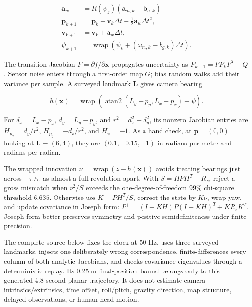 \[
\begin{aligned}
\mathbf{a}_w &= R(\psi_k)(\mathbf{a}_{m,k}-\mathbf{b}_{a,k}),\\
\mathbf{p}_{k+1} &= \mathbf{p}_k+\mathbf{v}_k\Delta t+\tfrac12\mathbf{a}_w\Delta t^2,\\
\mathbf{v}_{k+1} &= \mathbf{v}_k+\mathbf{a}_w\Delta t,\\
\psi_{k+1} &= \operatorname{wrap}(\psi_k+(\omega_{m,k}-b_{g,k})\Delta t).
\end{aligned}
\]

The transition Jacobian \(F=\partial f/\partial\mathbf{x}\) propagates uncertainty as \(P_{k+1}=FP_kF^T+Q\). Sensor noise enters through a first-order map \(G\); bias random walks add their variance per sample. A surveyed landmark \(\mathbf{L}\) gives camera bearing

\[
h(\mathbf{x})=\operatorname{wrap}\!\left(\operatorname{atan2}(L_y-p_y,L_x-p_x)-\psi\right).
\]

For \(d_x=L_x-p_x\), \(d_y=L_y-p_y\), and \(r^2=d_x^2+d_y^2\), its nonzero Jacobian entries are \(H_{p_x}=d_y/r^2\), \(H_{p_y}=-d_x/r^2\), and \(H_\psi=-1\). As a hand check, at \(\mathbf{p}=(0,0)\) looking at \(\mathbf{L}=(6,4)\), they are \((0.1,-0.15,-1)\) in radians per metre and radians per radian.

The wrapped innovation \(\nu=\operatorname{wrap}(z-h(\mathbf{x}))\) avoids treating bearings just across \(-\pi/\pi\) as almost a full revolution apart. With \(S=HPH^T+R_z\), reject a gross mismatch when \(\nu^2/S\) exceeds the one-degree-of-freedom 99\% chi-square threshold \(6.635\). Otherwise use \(K=PH^T/S\), correct the state by \(K\nu\), wrap yaw, and update covariance in Joseph form: \(P^+=(I-KH)P(I-KH)^T+KR_zK^T\). Joseph form better preserves symmetry and positive semidefiniteness under finite precision.

The complete source below fixes the clock at 50 Hz, uses three surveyed landmarks, injects one deliberately wrong correspondence, finite-differences every column of both analytic Jacobians, and checks covariance eigenvalues through a deterministic replay. Its 0.25 m final-position bound belongs only to this generated 4.8-second planar trajectory. It does not estimate camera intrinsics/extrinsics, time offset, roll/pitch, gravity direction, map structure, delayed observations, or human-head motion.

